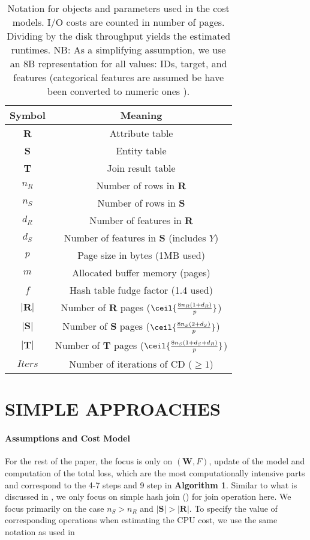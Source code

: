 \documentclass{vldb}
\begin{document}
\begin{table}[t]
\centering
\begin{tabular}{|c|c|}
\hline
\textbf{Symbol} & \textbf{Meaning} \\
\hline
\hline
\textbf{R} & Attribute table \\
\hline
\textbf{S} & Entity table \\
\hline
\textbf{T} & Join result table \\
\hline
$n_R$ & Number of rows in \textbf{R} \\
\hline
$n_S$ & Number of rows in \textbf{S} \\
\hline
$d_R$ & Number of features in \textbf{R} \\
\hline
$d_S$ & Number of features in \textbf{S} (includes $Y$) \\
\hline
$p$ & Page size in bytes (1MB used) \\
\hline
$m$ & Allocated buffer memory (pages) \\
\hline
$f$ & Hash table fudge factor (1.4 used) \\
\hline
$|\textbf{R}|$ & Number of \textbf{R} pages ($\ceil{\frac{8n_R (1 + d_R)}{p}}$)\\
\hline
$|\textbf{S}|$ & Number of \textbf{S} pages ($\ceil{\frac{8n_S (2 + d_S)}{p}}$) \\
\hline
$|\textbf{T}|$ & Number of \textbf{T} pages ($\ceil{\frac{8n_S (1 + d_S + d_R)}{p}}$)\\
\hline
$Iters$ & Number of iterations of CD ($\ge 1$)\\
\hline
\end{tabular}
\caption{Notation for objects  and parameters used in the cost models. I/O costs are counted in number of pages. Dividing by the disk throughput yields
the estimated runtimes. NB: As a simplifying assumption, we use an 8B representation for all values: IDs, target, and features (categorical features are 
assumed be have been converted to numeric ones \cite{hastie}).
}
\label{tab:symbol&meaning}
\end{table}


\section{SIMPLE APPROACHES}
\paragraph*{Assumptions and Cost Model}
For the rest of the paper, the focus is only on $(\textbf{W}, F)$, update of the model and computation of the total loss, which are the most
computationally intensive parts and correspond to the 4-7 steps and 9 step in \textbf{Algorithm 1}. Similar to what is discussed in \cite{Kumar}, we only focus on simple hash join (\cite{Shapiro}) for join operation here. We focus primarily on the case $n_{S}>n_{R}$ and $|\textbf{S}| > |\textbf{R}|$.  To specify the value of corresponding operations when estimating the CPU cost, we use the same notation as used in \cite{Kumar}
\end{document}
